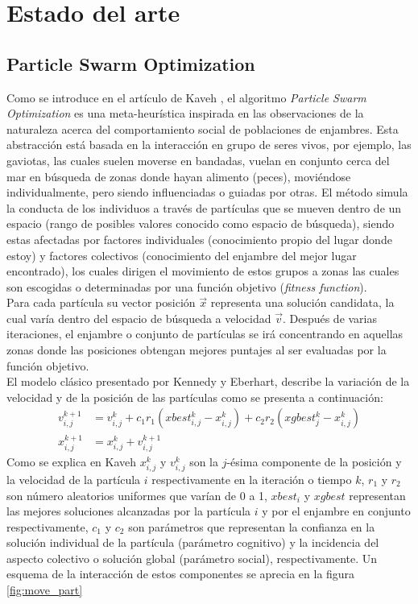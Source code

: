 
\chapter{Estado del arte}
\section{Particle Swarm Optimization}
Como se introduce en el artículo de Kaveh \cite{Psoexplain14}, el algoritmo \emph{Particle Swarm Optimization} es una meta-heurística inspirada en las observaciones de la naturaleza acerca del comportamiento social de poblaciones de enjambres. Esta abstracción está basada en la interacción en grupo de seres vivos, por ejemplo, las gaviotas, las cuales suelen moverse en bandadas, vuelan en conjunto cerca del mar en búsqueda de zonas donde hayan alimento (peces), moviéndose individualmente, pero siendo influenciadas o guiadas por otras. El método simula la conducta de los individuos a través de partículas que se mueven dentro de un espacio (rango de posibles valores conocido como espacio de búsqueda), siendo estas afectadas por factores individuales (conocimiento propio del lugar donde estoy) y factores colectivos (conocimiento del enjambre del mejor lugar encontrado), los cuales dirigen el movimiento de estos grupos a zonas las cuales son escogidas o determinadas por una función objetivo (\emph{fitness function}).\\
Para cada partícula su vector posición  $\vec{x}$ representa una solución candidata, la cual varía dentro del espacio de búsqueda a velocidad $\vec{v}$. Después de varias iteraciones, el enjambre o conjunto de partículas se irá concentrando en aquellas zonas donde las posiciones obtengan mejores puntajes al ser evaluadas por la función objetivo.
\\El modelo clásico presentado por Kennedy y Eberhart\cite{Kennedy95}, describe la variación de la velocidad y de la posición de las partículas como se presenta a continuación:
\begin{align}
    v_{i,j}^{k+1} &= v_{i,j}^{k} + c_{1}r_{1}(xbest_{i,j}^k - x_{i,j}^k) + c_{2}r_{2}(xgbest_{j}^{k} - x_{i,j}^k) \\
    x_{i,j}^{k+1} &= x_{i,j}^{k} + v_{i,j}^{k+1}
\end{align}    
Como se explica en Kaveh \cite{Psoexplain14} $x_{i,j}^{k}$ y $v_{i,j}^{k}$ son la $j$-ésima componente de la posición y la velocidad de la partícula $i$ respectivamente en la iteración o tiempo $k$, $r_{1}$ y $r_{2}$ son número aleatorios uniformes que varían de 0 a 1, $xbest_i$ y $xgbest$ representan las mejores soluciones alcanzadas por la partícula $i$ y por el enjambre en conjunto respectivamente, $c_1$ y $c_2$ son parámetros que representan la confianza en la solución individual de la partícula (parámetro cognitivo) y la incidencia del aspecto colectivo o solución global (parámetro social), respectivamente. Un esquema de la interacción de estos componentes se aprecia en la figura \ref{fig:move_part}\\
